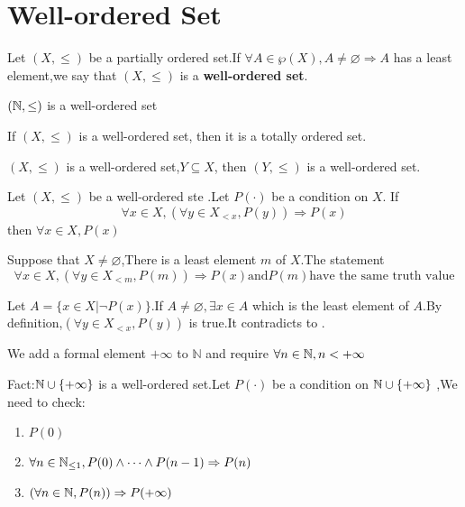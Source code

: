 \documentclass{book}
\numberwithin{equation}{section}
\begin{document}
\section{Well-ordered Set}
\begin{definitionenv}
    Let $(X,\le)$ be a partially ordered set.If $\forall A\in \wp(X),A\not=\varnothing\Rightarrow A$ has a least element,we say that $(X,\le)$ is a \textbf{well-ordered set}.
\end{definitionenv}
\begin{axiomenv}
    $(\mathbb{N},\le)$ is a well-ordered set 
\end{axiomenv}
\begin{propositionenv}
    If $(X,\le)$ is a well-ordered set, then it is a totally ordered set.
\end{propositionenv}
\begin{propositionenv}
    $(X,\le)$ is a well-ordered set,$Y\subseteq X$, then $(Y,\le)$ is a well-ordered set. 
\end{propositionenv}
\begin{theoremenv}
    Let $(X,\le)$ be a well-ordered ste .Let $P(\cdot)$ be a condition on $X$. If 
    $$\forall x\in X,(\forall y\in X_{<x} ,P(y))\Rightarrow P(x)$$
    then $\forall x\in X,P(x)$
\end{theoremenv}
\begin{remark}
    Suppose that $X\not=\varnothing$,There is a least element $m$ of $X$.The statement
    $$\forall x\in X,(\forall y\in X_{<m} ,P(m))\Rightarrow P(x) \text{and} P(m) \text{have the same truth value}$$
\end{remark}
\begin{proofenv}
    Let $A=\{x\in X|\neg P(x)\}$.If $A\not=\varnothing,\exists x\in A$ which is the least element of $A$.By definition,$(\forall y\in X_{<x} ,P(y))$ is true.It contradicts to .
\end{proofenv}
\begin{remark}
    We add a formal element $+\infty$ to $\mathbb{N}$ and require $\forall n\in \mathbb{N}, n<+\infty$
\end{remark}
Fact:$\mathbb{N} \cup \{+\infty\}$ is a well-ordered set.Let $P(\cdot)$ be a condition on $\mathbb{N} \cup \{+\infty\}$ ,We need to check:
\begin{enumerate}
    \item $P(0)$
    \item $\forall n\in \mathbb{N}_{\leq 1},P(0)\wedge\dots\wedge P(n-1)\Rightarrow P(n)$
    \item $(\forall n \in \mathbb{N},P(n))\Rightarrow P(+\infty)$
\end{enumerate}
\end{document}
